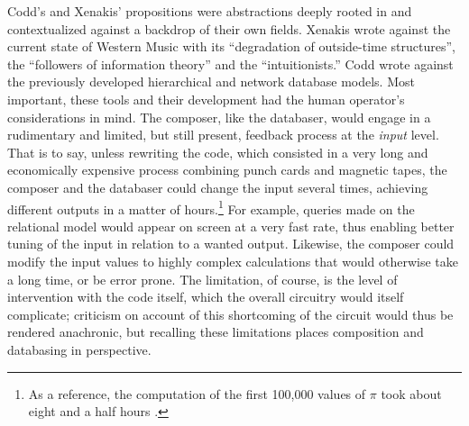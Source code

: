 Codd's and Xenakis' propositions were abstractions deeply rooted in and contextualized against a backdrop of their own fields. Xenakis wrote against the current state of Western Music with its ``degradation of outside-time structures'', the ``followers of information theory'' and the ``intuitionists.'' Codd wrote against the previously developed hierarchical and network database models. Most important, these tools and their development had the human operator's considerations in mind. The composer, like the databaser, would engage in a rudimentary and limited, but still present, feedback process at the \textit{input} level. That is to say, unless rewriting the code, which consisted in a very long and economically expensive process combining punch cards and magnetic tapes, the composer and the databaser could change the input several times, achieving different outputs in a matter of hours.\footnote{As a reference, the computation of the first 100,000 values of $\pi$ took about eight and a half hours \parencite{picalc}.} For example, queries made on the relational model would appear on screen at a very fast rate, thus enabling better tuning of the input in relation to a wanted output. Likewise, the composer could modify the input values to highly complex calculations that would otherwise take a long time, or be error prone. The limitation, of course, is the level of intervention with the code itself, which the overall circuitry would itself complicate; criticism on account of this shortcoming of the circuit would thus be rendered anachronic, but recalling these limitations places composition and databasing in perspective.


